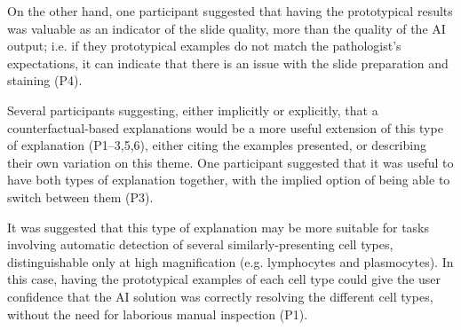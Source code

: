 
On the other hand, one participant suggested that having the prototypical results was valuable as an indicator of the slide quality, more than the quality of the AI output; i.e. if they prototypical examples do not match the pathologist's expectations, it can indicate that there is an issue with the slide preparation and staining (P4).


Several participants suggesting, either implicitly or explicitly, that a counterfactual-based explanations would be a more useful extension of this type of explanation (P1--3,5,6), either citing the examples presented, or describing their own variation on this theme. One participant suggested that it was useful to have both types of explanation together, with the implied option of being able to switch between them (P3).


It was suggested that this type of explanation may be more suitable for tasks involving automatic detection of several similarly-presenting cell types, distinguishable only at high magnification (e.g. lymphocytes and plasmocytes). In this case, having the prototypical examples of each cell type could give the user confidence that the AI solution was correctly resolving the different cell types, without the need for laborious manual inspection (P1).



